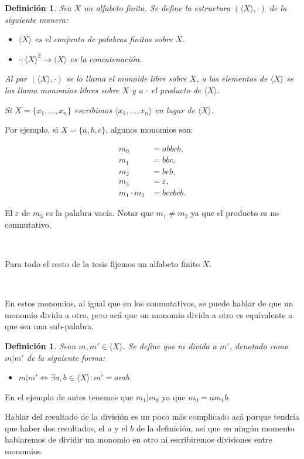 \documentclass[12pt]{report}
\theoremstyle{customstyle}
\newtheorem{definition}[theorem]{Definición}
\theoremstyle{factstyle}
\begin{document}
\begin{definition}
  Sea $X$ un alfabeto finito. Se define la estructura $(⟨X⟩, ·)$ de la siguiente manera:
  \begin{itemize}
    \item $⟨X⟩$ es el conjunto de palabras finitas sobre $X$.
    \item $· : ⟨X⟩^2 → ⟨X⟩$ es la concatenación.
  \end{itemize}
  Al par $(⟨X⟩, ·)$ se lo llama el monoide libre sobre $X$, a los elementos de $⟨X⟩$ se los llama monomios libres sobre $X$ y a $·$ el producto de $⟨X⟩$.

  Si $X = \{x_1, …, x_n\}$ escribimos $⟨x_1, …, x_n⟩$ en lugar de $⟨X⟩$.
\end{definition}

Por ejemplo, si $X = \{a, b, c\}$, algunos monomios son:

\begin{align*}
  m_0 &= abbcb \text{,} \\
  m_1 &= bbc \text{,} \\
  m_2 &= bcb \text{,} \\
  m_3 &= ε \text{,} \\
  m_1 · m_2 &= bccbcb \text{.}
\end{align*}

El $ε$ de $m_3$ es la palabra vacía. Notar que $m_1 ≠ m_2$ ya que el producto es no conmutativo.

\

Para todo el resto de la tesis fijemos un alfabeto finito $X$.

\

En estos monomios, al igual que en los conmutativos, se puede hablar de que un monomio divida a otro, pero acá que un monomio divida a otro es equivalente a que sea una sub-palabra.

\begin{definition}
  Sean $m, m' ∈ ⟨X⟩$. Se define que $m$ divida a $m'$, denotado como $m | m'$ de la siguiente forma:
  \begin{itemize}
    \item $m | m' ⇔ ∃a , b ∈ ⟨X⟩ : m' = a m b$.
  \end{itemize}
\end{definition}

En el ejemplo de antes tenemos que $m_1 | m_0$ ya que $m_0 = a m_1 b$.

Hablar del resultado de la división es un poco más complicado acá porque tendría que haber dos resultados, el $a$ y el $b$ de la definición, así que en ningún momento hablaremos de dividir un monomio en otro ni escribiremos divisiones entre monomios.
\end{document}
